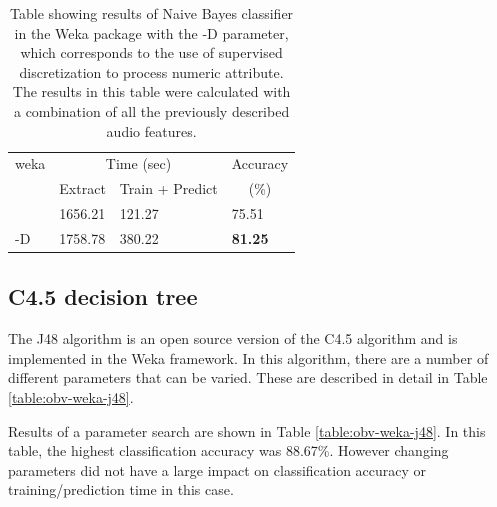 \begin{table}
\begin{tabular}{|l|l|l|l|}
\hline
\multicolumn{1}{|c|}{weka} & \multicolumn{2}{c|}{Time (sec)} & Accuracy \\
\hhline{|~|-|-|~|}
\multicolumn{1}{|c|}{param} & Extract & Train + Predict & \multicolumn{1}{c|}{(\%)} \\
\hhline{|=|=|=|=|}
    &  1656.21  &     121.27  &  75.51  \\
-D  &  1758.78  &     380.22  &  \textbf{81.25}  \\
\hline
\end{tabular}
\caption{Table showing results of Naive Bayes
  classifier in the Weka package with the -D parameter, which
  corresponds to the use of supervised discretization to process
  numeric attribute.  The results in this table were calculated with a
  combination of all the previously described audio features.}
\label{table:obv-weka-naiveBayes}
\end{table}


%
%
\subsection{C4.5 decision tree}

The J48 algorithm is an open source version of the C4.5 algorithm and
is implemented in the Weka framework.  In this algorithm, there are a
number of different parameters that can be varied.  These are
described in detail in Table \ref{table:obv-weka-j48}.

Results of a parameter search are shown in Table
\ref{table:obv-weka-j48}.  In this table, the highest classification
accuracy was 88.67\%.  However changing parameters did not have a
large impact on classification accuracy or training/prediction time in
this case.

